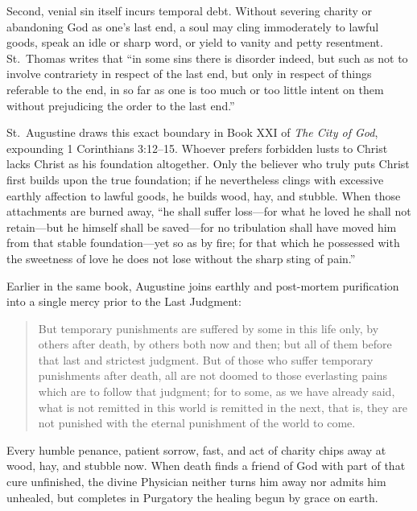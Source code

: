 Second, venial sin itself incurs temporal debt. Without severing charity or abandoning God as one's last end, a soul may cling immoderately to lawful goods, speak an idle or sharp word, or yield to vanity and petty resentment. St.\ Thomas writes that ``in some sins there is disorder indeed, but such as not to involve contrariety in respect of the last end, but only in respect of things referable to the end, in so far as one is too much or too little intent on them without prejudicing the order to the last end.''

St.\ Augustine draws this exact boundary in Book XXI of \textit{The City of God}, expounding 1 Corinthians 3:12--15. Whoever prefers forbidden lusts to Christ lacks Christ as his foundation altogether. Only the believer who truly puts Christ first builds upon the true foundation; if he nevertheless clings with excessive earthly affection to lawful goods, he builds wood, hay, and stubble. When those attachments are burned away, ``he shall suffer loss---for what he loved he shall not retain---but he himself shall be saved---for no tribulation shall have moved him from that stable foundation---yet so as by fire; for that which he possessed with the sweetness of love he does not lose without the sharp sting of pain.''

Earlier in the same book, Augustine joins earthly and post-mortem purification into a single mercy prior to the Last Judgment:

\begin{quote}
But temporary punishments are suffered by some in this life only, by others after death, by others both now and then; but all of them before that last and strictest judgment. But of those who suffer temporary punishments after death, all are not doomed to those everlasting pains which are to follow that judgment; for to some, as we have already said, what is not remitted in this world is remitted in the next, that is, they are not punished with the eternal punishment of the world to come.
\end{quote}

Every humble penance, patient sorrow, fast, and act of charity chips away at wood, hay, and stubble now. When death finds a friend of God with part of that cure unfinished, the divine Physician neither turns him away nor admits him unhealed, but completes in Purgatory the healing begun by grace on earth.
